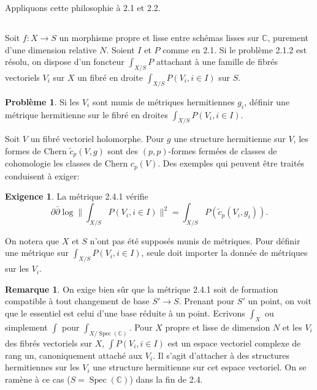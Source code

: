 \documentclass[12pt,a4paper]{article}
\theoremstyle{plain}
\theoremstyle{definition}
\newtheorem{remark}[theorem]{Remarque}
\newtheorem{probleme}[theorem]{Probl\`eme}
\newtheorem{exigence}[theorem]{Exigence}
\DeclareMathOperator{\Spec}{Spec}
\newcommand{\CC}{\mathbb{C}}
\begin{document}
Appliquons cette philosophie \`a 2.1 et 2.2.

\subsection{}

Soit $f: X \to S$ un morphisme propre et lisse entre sch\'emas lisses sur $\CC$,
purement d'une dimension relative $N$. Soient $I$ et $P$ comme en 2.1. Si le
probl\`eme 2.1.2 est r\'esolu, on dispose d'un foncteur $\int_{X/S} P$ attachant \`a une famille
de fibr\'es vectoriels $V_i$ sur $X$ un fibr\'e en droite $\int_{X/S} P(V_i, i \in I)$ sur
$S$.

\begin{probleme}
Si les $V_i$ sont munis de m\'etriques hermitiennes $g_i$, d\'efinir
une m\'etrique hermitienne sur le fibr\'e en droites $\int_{X/S} P(V_i, i \in I)$.
\end{probleme}

Soit $V$ un fibr\'e vectoriel holomorphe. Pour $g$ une structure hermitienne
sur $V$, les formes de Chern $\tilde{c}_p(V,g)$ sont des $(p,p)$-formes ferm\'ees de classes
de cohomologie les classes de Chern $c_p(V)$. Des exemples qui peuvent \^etre trait\'es
conduisent \`a exiger:

\begin{exigence}
La m\'etrique 2.4.1 v\'erifie
\[
\partial \bar\partial \log \|\textstyle \int_{X/S} P(V_i, i \in I)\|^2 = \int_{X/S} P(\tilde{c}_p(V_i, g_i)) .
\]
\end{exigence}

On notera que $X$ et $S$ n'ont pas \'et\'e suppos\'es munis de m\'etriques. Pour
d\'efinir une m\'etrique sur $\int_{X/S} P(V_i, i \in I)$, seule doit importer la donn\'ee
de m\'etriques sur les $V_i$.

\begin{remark}
On exige bien s\^ur que la m\'etrique 2.4.1 soit de formation compatible
\`a tout changement de base $S' \to S$. Prenant pour $S'$ un point, on voit que le
essentiel est celui d'une base r\'eduite \`a un point. Ecrivons $\int_X$ ou simplement
$\int$ pour $\int_{X/\Spec(\CC)}$. Pour $X$ propre et lisse de dimension $N$ et les $V_i$ des
fibr\'es vectoriels sur $X$, $\int P(V_i, i \in I)$ est un espace vectoriel complexe de
rang un, canoniquement attach\'e aux $V_i$. Il s'agit d'attacher \`a des structures
hermitiennes sur les $V_i$ une structure hermitienne sur cet espace vectoriel.
On se ram\`ene \`a ce cas ($S = \Spec(\CC)$) dans la fin de 2.4.
\end{remark}
\end{document}
